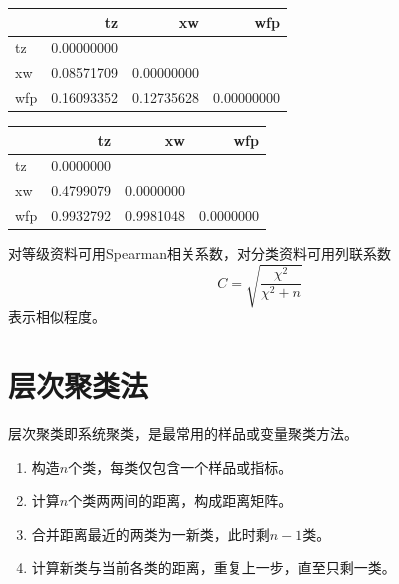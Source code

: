 \par\addvspace{5pt}\begin{center}\begin{minipage}{\linewidth}\centering
\small
{}
\begin{tabular}{lrrr}\toprule
 &{\bfseries  tz }&{\bfseries  xw }&{\bfseries  wfp}\\\midrule
tz & 0.00000000 &  & \\
xw & 0.08571709 & 0.00000000 & \\
wfp & 0.16093352 & 0.12735628 & 0.00000000\\
\bottomrule\end{tabular}
\end{minipage}\end{center}
\par\addvspace{5pt}\begin{center}\begin{minipage}{\linewidth}\centering
\small
{}
\begin{tabular}{lrrr}\toprule
 &{\bfseries  tz }&{\bfseries  xw }&{\bfseries  wfp}\\\midrule
tz & 0.0000000 &  & \\
xw & 0.4799079 & 0.0000000 & \\
wfp & 0.9932792 & 0.9981048 & 0.0000000\\
\bottomrule\end{tabular}
\end{minipage}\end{center}

对等级资料可用Spearman相关系数，对分类资料可用列联系数
\[
C=\sqrt{\frac{\chi^2}{\chi^2+n}}
\]
表示相似程度。
\section{层次聚类法}
层次聚类即系统聚类，是最常用的样品或变量聚类方法。
\begin{enumerate}
\item 构造$n$个类，每类仅包含一个样品或指标。
\item 计算$n$个类两两间的距离，构成距离矩阵。
\item 合并距离最近的两类为一新类，此时剩$n-1$类。
\item 计算新类与当前各类的距离，重复上一步，直至只剩一类。
\end{enumerate}
